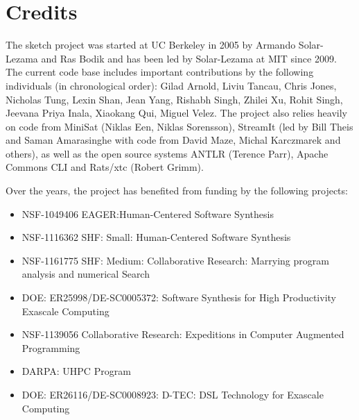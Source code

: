 \section{Credits}

The sketch project was started at UC Berkeley in 2005 by Armando Solar-Lezama and Ras Bodik and has been led by Solar-Lezama at MIT since 2009. The current code base includes important contributions by the following individuals (in chronological order): 
Gilad Arnold,
Liviu Tancau,
Chris Jones,
Nicholas Tung,
Lexin Shan,
Jean Yang,
Rishabh Singh,
Zhilei Xu,
Rohit Singh,
Jeevana Priya Inala,
Xiaokang Qui,
Miguel Velez.
The project also relies heavily on code from MiniSat (Niklas Een, Niklas Sorensson), StreamIt (led by Bill Theis and Saman Amarasinghe with code from David Maze, Michal Karczmarek and others), as well as the open source systems ANTLR (Terence Parr), Apache Commons CLI and Rats/xtc (Robert Grimm).

Over the years, the project has benefited from funding by the following projects:
\begin{itemize}
\item NSF-1049406 EAGER:Human-Centered Software Synthesis
\item NSF-1116362  SHF: Small: Human-Centered Software Synthesis
\item NSF-1161775 SHF: Medium: Collaborative Research: Marrying program analysis and numerical Search
\item DOE: ER25998/DE-SC0005372: Software Synthesis for High Productivity Exascale Computing
\item NSF-1139056 Collaborative Research: Expeditions in Computer Augmented Programming
\item DARPA: UHPC Program
\item DOE: ER26116/DE-SC0008923: D-TEC: DSL Technology for Exascale Computing 
\end{itemize}

